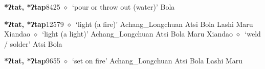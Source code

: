   \begin{list}{}{\leftmargin=1.5em \itemindent=-1.5em}
  \item {\footnotesize \textbf{*ʔtat, *ʔtap}}{\tiny 8425}
         $\diamond$~`pour or throw out (water)'
         Bola 
  \item {\footnotesize \textbf{*ʔtat, *ʔtap}}{\tiny 12579}
\hspace{1ex}
         $\diamond$~`light (a fire)'
         Achang\_Longchuan 
\hspace{1ex}
         Atsi 
\hspace{1ex}
         Bola 
\hspace{1ex}
         Lashi 
\hspace{1ex}
         Maru 
\hspace{1ex}
         Xiandao 
\hspace{1ex}
         $\diamond$~`light (a light)'
         Achang\_Longchuan 
\hspace{1ex}
         Atsi 
\hspace{1ex}
         Bola 
\hspace{1ex}
         Maru 
\hspace{1ex}
         Xiandao 
\hspace{1ex}
         $\diamond$~`weld / solder'
         Atsi 
\hspace{1ex}
         Bola 
  \item {\footnotesize \textbf{*ʔtat, *ʔtap}}{\tiny 9655}
\hspace{1ex}
         $\diamond$~`set on fire'
         Achang\_Longchuan 
\hspace{1ex}
         Atsi 
\hspace{1ex}
         Bola 
\hspace{1ex}
         Lashi 
\hspace{1ex}
         Maru 

\end{list}
